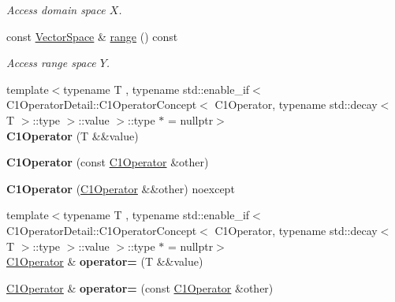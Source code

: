 \begin{DoxyCompactItemize}
\begin{DoxyCompactList}\small\item\em Access domain space $X$. \end{DoxyCompactList}\item 
const \hyperlink{classSpacy_1_1VectorSpace}{Vector\+Space} \& \hyperlink{classSpacy_1_1C1Operator_a7df27427591907b13776e7ba3707bf05}{range} () const \hypertarget{classSpacy_1_1C1Operator_a7df27427591907b13776e7ba3707bf05}{}\label{classSpacy_1_1C1Operator_a7df27427591907b13776e7ba3707bf05}

\begin{DoxyCompactList}\small\item\em Access range space $Y$. \end{DoxyCompactList}\item 
{\footnotesize template$<$typename T , typename std\+::enable\+\_\+if$<$ C1\+Operator\+Detail\+::\+C1\+Operator\+Concept$<$ C1\+Operator, typename std\+::decay$<$ T $>$\+::type $>$\+::value $>$\+::type $\ast$  = nullptr$>$ }\\{\bfseries C1\+Operator} (T \&\&value)\hypertarget{classSpacy_1_1C1Operator_a9a46e9d2fb4526fa320480b832c5b71e}{}\label{classSpacy_1_1C1Operator_a9a46e9d2fb4526fa320480b832c5b71e}

\item 
{\bfseries C1\+Operator} (const \hyperlink{classSpacy_1_1C1Operator}{C1\+Operator} \&other)\hypertarget{classSpacy_1_1C1Operator_a5524db9b344fbab2f183f7b509fb7f26}{}\label{classSpacy_1_1C1Operator_a5524db9b344fbab2f183f7b509fb7f26}

\item 
{\bfseries C1\+Operator} (\hyperlink{classSpacy_1_1C1Operator}{C1\+Operator} \&\&other) noexcept\hypertarget{classSpacy_1_1C1Operator_ac75138b84319896392feea5baa7c333e}{}\label{classSpacy_1_1C1Operator_ac75138b84319896392feea5baa7c333e}

\item 
{\footnotesize template$<$typename T , typename std\+::enable\+\_\+if$<$ C1\+Operator\+Detail\+::\+C1\+Operator\+Concept$<$ C1\+Operator, typename std\+::decay$<$ T $>$\+::type $>$\+::value $>$\+::type $\ast$  = nullptr$>$ }\\\hyperlink{classSpacy_1_1C1Operator}{C1\+Operator} \& {\bfseries operator=} (T \&\&value)\hypertarget{classSpacy_1_1C1Operator_aecfc71bf5da728a9028a586e50afbfcf}{}\label{classSpacy_1_1C1Operator_aecfc71bf5da728a9028a586e50afbfcf}

\item 
\hyperlink{classSpacy_1_1C1Operator}{C1\+Operator} \& {\bfseries operator=} (const \hyperlink{classSpacy_1_1C1Operator}{C1\+Operator} \&other)\hypertarget{classSpacy_1_1C1Operator_aff6bc2122b654f9df5e8a05dff4ae494}{}\label{classSpacy_1_1C1Operator_aff6bc2122b654f9df5e8a05dff4ae494}


\end{DoxyCompactItemize}
